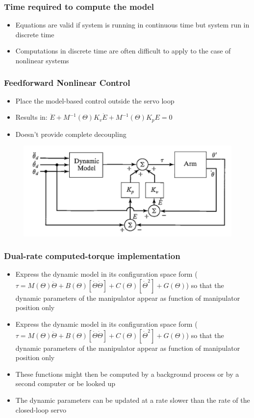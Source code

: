 \documentclass[10pt,a4paper]{article}
\begin{document}
\subsubsection{Time required to compute the model}
\begin{itemize}
	\item Equations are valid if system is running in continuous time but system run in discrete time
	\item Computations in discrete time are often difficult to apply to the case of nonlinear systems
\end{itemize}

\subsubsection{Feedforward Nonlinear Control}
\begin{itemize}
	\item Place the model-based control outside the servo loop
	\item Results in: $\ddot E + M^{-1}(\Theta) K_v \dot E + M^{-1}(\Theta) K_p E = 0$
	\item Doesn't provide complete decoupling
\end{itemize}

\begin{figure}[H]
	\includegraphics[width=0.5\columnwidth]{imgs/trajectory_following_feedforward.png}
\end{figure}

\subsubsection{Dual-rate computed-torque implementation}
\begin{itemize}
	\item Express the dynamic model in its configuration space form ($\tau = M(\Theta)\ddot \Theta + B(\Theta)[\dot \Theta \dot \Theta] + C(\Theta)[\dot \Theta^2] + G(\Theta)$) so that the dynamic parameters of the manipulator appear as function of manipulator position only
	\item Express the dynamic model in its configuration space form ($\tau = M(\Theta)\ddot \Theta + B(\Theta)[\dot \Theta \dot \Theta] + C(\Theta)[\dot \Theta^2] + G(\Theta)$) so that the dynamic parameters of the manipulator appear as function of manipulator position only
	\item These functions might then be computed by a background process or by a second computer or be looked up
	\item The dynamic parameters can be updated at a rate slower than the rate of the closed-loop servo
\end{itemize}
\end{document}

